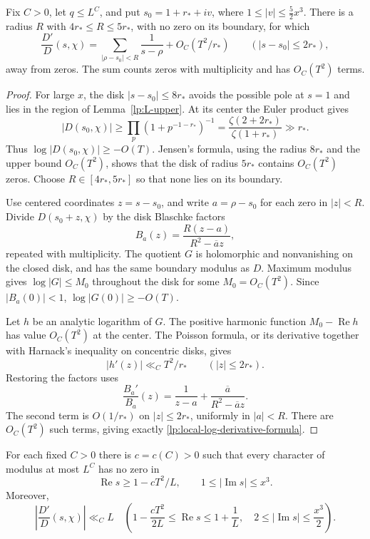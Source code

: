 \begin{lemma}\label{lp:local-log-derivative}
Fix $C>0$, let $q\le L^C$, and put
$s_0=1+r_*+iv$, where $1\le|v|\le\tfrac52x^3$.
There is a radius $R$ with $4r_*\le R\le5r_*$, with no zero on
its boundary, for which
\begin{equation}\label{lp:local-log-derivative-formula}
 \frac{D'}{D}(s,\chi)
 =\sum_{|\rho-s_0|<R}\frac1{s-\rho}
       +O_C(T^2/r_*)\qquad(|s-s_0|\le2r_*),
\end{equation}
away from zeros.  The sum counts zeros with multiplicity and has
$O_C(T^2)$ terms.
\end{lemma}

\begin{proof}
For large $x$, the disk $|s-s_0|\le8r_*$ avoids the possible pole at
$s=1$ and lies in the region of Lemma~\ref{lp:L-upper}.
At its center the Euler product gives
\[
 |D(s_0,\chi)|\ge\prod_p(1+p^{-1-r_*})^{-1}
       =\frac{\zeta(2+2r_*)}{\zeta(1+r_*)}\gg r_*.
\]
Thus $\log|D(s_0,\chi)|\ge-O(T)$.  Jensen's formula, using the
radius $8r_*$ and the upper bound $O_C(T^2)$, shows that the disk
of radius $5r_*$ contains $O_C(T^2)$ zeros.  Choose $R\in[4r_*,5r_*]$
so that none lies on its boundary.

Use centered coordinates $z=s-s_0$, and write $a=\rho-s_0$ for
each zero in $|z|<R$.  Divide $D(s_0+z,\chi)$ by the disk Blaschke
factors
\[
 B_a(z)=\frac{R(z-a)}{R^2-\overline a z},
\]
repeated with multiplicity.  The quotient $G$ is holomorphic and
nonvanishing on the closed disk, and has the same boundary modulus
as $D$.  Maximum modulus gives $\log|G|\le M_0$ throughout the
disk for some $M_0=O_C(T^2)$.  Since $|B_a(0)|<1$,
$\log|G(0)|\ge-O(T)$.

Let $h$ be an analytic logarithm of $G$.  The positive harmonic
function $M_0-\operatorname{Re}h$ has value $O_C(T^2)$ at the
center.  The Poisson formula, or its derivative together with Harnack's
inequality on concentric disks, gives
\[
 |h'(z)|\ll_C T^2/r_*\qquad(|z|\le2r_*).
\]
Restoring the factors uses
\[
 \frac{B_a'}{B_a}(z)=\frac1{z-a}
       +\frac{\overline a}{R^2-\overline a z}.
\]
The second term is $O(1/r_*)$ on $|z|\le2r_*$, uniformly in
$|a|<R$.  There are $O_C(T^2)$ such terms, giving exactly
\eqref{lp:local-log-derivative-formula}.
\end{proof}

\begin{lemma}\label{lp:zero-free}
For each fixed $C>0$ there is $c=c(C)>0$ such that every character
of modulus at most $L^C$ has no zero in
\begin{equation}\label{lp:zero-free-region}
 \operatorname{Re}s\ge1-cT^2/L,\qquad
                    1\le|\operatorname{Im}s|\le x^3.
\end{equation}
Moreover,
\begin{equation}\label{lp:log-derivative-bound}
 \left|\frac{D'}D(s,\chi)\right|\ll_C L
 \quad\left(1-\frac{cT^2}{2L}\le\operatorname{Re}s\le1+\frac1L,
       \quad2\le|\operatorname{Im}s|\le\frac{x^3}{2}\right).
\end{equation}
\end{lemma}

